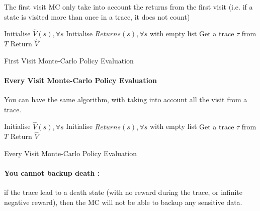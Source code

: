 			The first visit MC only take into account the returns from the first visit (i.e. if a state is visited more than once in a trace, it does not count) \\
			\begin{algorithm}[H]
				Initialise $\hat V(s), \forall s$\;
				Initialise $Returns(s), \forall s$ with empty list
				{
					Get a trace $\tau$ from $T$ \;
				}
				Return $\hat V$ \;
				\caption{First Visit Monte-Carlo Policy Evaluation}
			\end{algorithm}

		\paragraph*{Every Visit Monte-Carlo Policy Evaluation}

			You can have the same algorithm, with taking into account all the visit from a trace. \\

			\begin{algorithm}[H]
				Initialise $\hat V(s), \forall s$\;
				Initialise $Returns(s), \forall s$ with empty list
				{
					Get a trace $\tau$ from $T$ \;
				}
				Return $\hat V$ \;
				\caption{Every Visit Monte-Carlo Policy Evaluation}
			\end{algorithm}


		\paragraph*{You cannot backup death :} 
			if the trace lead to a death state (with no reward during the trace, or infinite negative reward), then the MC will not be able to backup any sensitive data. 

